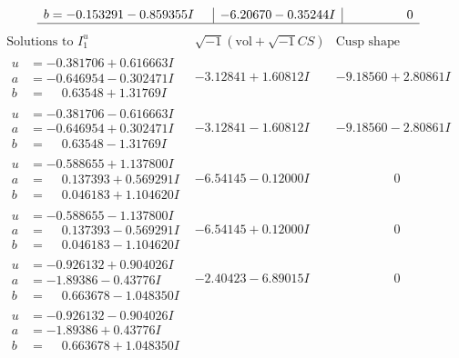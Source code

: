 \documentclass[1p]{elsarticle_modified}
\theoremstyle{definition}
\newcommand{\I}{\sqrt{-1}}
\begin{document}
$$\begin{array}{c|c|c}
\begin{aligned}
b &= -0.153291 - 0.859355 I\end{aligned}
 & -6.20670 - 0.35244 I & \phantom{-0.000000 } 0\\
 \hline 
 \end{array}$$\newpage$$\begin{array}{c|c|c}  
\text{Solutions to }I^u_{1}& \I (\text{vol} + \sqrt{-1}CS) & \text{Cusp shape}\\
 \hline 
\begin{aligned}
u &= -0.381706 + 0.616663 I \\
a &= -0.646954 - 0.302471 I \\
b &= \phantom{-}0.63548 + 1.31769 I\end{aligned}
 & -3.12841 + 1.60812 I & -9.18560 + 2.80861 I \\ \hline\begin{aligned}
u &= -0.381706 - 0.616663 I \\
a &= -0.646954 + 0.302471 I \\
b &= \phantom{-}0.63548 - 1.31769 I\end{aligned}
 & -3.12841 - 1.60812 I & -9.18560 - 2.80861 I \\ \hline\begin{aligned}
u &= -0.588655 + 1.137800 I \\
a &= \phantom{-}0.137393 + 0.569291 I \\
b &= \phantom{-}0.046183 + 1.104620 I\end{aligned}
 & -6.54145 - 0.12000 I & \phantom{-0.000000 } 0 \\ \hline\begin{aligned}
u &= -0.588655 - 1.137800 I \\
a &= \phantom{-}0.137393 - 0.569291 I \\
b &= \phantom{-}0.046183 - 1.104620 I\end{aligned}
 & -6.54145 + 0.12000 I & \phantom{-0.000000 } 0 \\ \hline\begin{aligned}
u &= -0.926132 + 0.904026 I \\
a &= -1.89386 - 0.43776 I \\
b &= \phantom{-}0.663678 - 1.048350 I\end{aligned}
 & -2.40423 - 6.89015 I & \phantom{-0.000000 } 0 \\ \hline\begin{aligned}
u &= -0.926132 - 0.904026 I \\
a &= -1.89386 + 0.43776 I \\
b &= \phantom{-}0.663678 + 1.048350 I\end{aligned}

\end{array}$$
\end{document}
